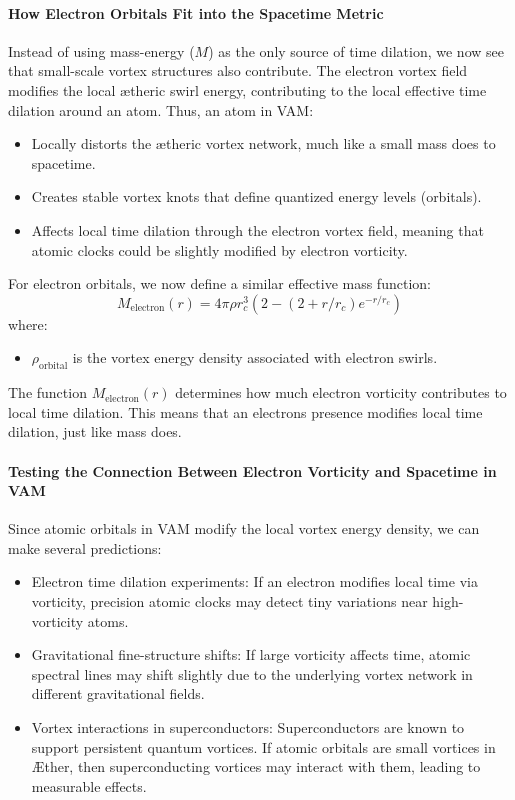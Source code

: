 \paragraph{How Electron Orbitals Fit into the Spacetime Metric}
Instead of using mass-energy ($M$) as the only source of time dilation, we now see that small-scale vortex structures also contribute.
The electron vortex field modifies the local ætheric swirl energy, contributing to the local effective time dilation around an atom.
Thus, an atom in VAM:
\begin{itemize}
    \item Locally distorts the ætheric vortex network, much like a small mass does to spacetime.
    \item Creates stable vortex knots that define quantized energy levels (orbitals).
    \item Affects local time dilation through the electron vortex field, meaning that atomic clocks could be slightly modified by electron vorticity.
\end{itemize}
For electron orbitals, we now define a similar effective mass function:
\begin{equation*}
    M_\text{electron}(r)=4 \pi \rho r_c^3  \left( 2 - (2 + r/r_c) e^{-r / r_c} \right)
\end{equation*}
where:
\begin{itemize}
    \item $\rho_\text{orbital}$ is the vortex energy density associated with electron swirls.
\end{itemize}
The function $M_\text{electron}(r)$ determines how much electron vorticity contributes to local time dilation.
This means that an electron\rqs s presence modifies local time dilation, just like mass does.

\paragraph{Testing the Connection Between Electron Vorticity and Spacetime in VAM}
Since atomic orbitals in VAM modify the local vortex energy density, we can make several predictions:
\begin{itemize}
    \item Electron time dilation experiments: If an electron modifies local time via vorticity, precision atomic clocks may detect tiny variations near high-vorticity atoms.
    \item Gravitational fine-structure shifts: If large vorticity affects time, atomic spectral lines may shift slightly due to the underlying vortex network in different gravitational fields.
    \item Vortex interactions in superconductors: Superconductors are known to support persistent quantum vortices. If atomic orbitals are small vortices in Æther, then superconducting vortices may interact with them, leading to measurable effects.
\end{itemize}

